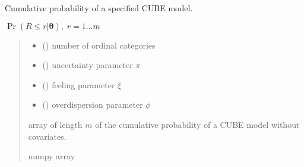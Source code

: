 \documentclass[letterpaper,10pt,english]{sphinxmanual}
\begin{document}
\begin{fulllineitems}
\label{\detokenize{cubmods:cubmods.cube.cmf}}
\pysigstartsignatures
{}
\pysigstopsignatures
\sphinxAtStartPar
Cumulative probability of a specified CUBE model.

\sphinxAtStartPar
\(\Pr(R \leq r | \pmb\theta),\; r=1 \ldots m\)
\begin{quote}\begin{description}
\begin{itemize}
\item {} 
\sphinxAtStartPar
{} () \textendash{} number of ordinal categories

\item {} 
\sphinxAtStartPar
{} () \textendash{} uncertainty parameter \(\pi\)

\item {} 
\sphinxAtStartPar
{} () \textendash{} feeling parameter \(\xi\)

\item {} 
\sphinxAtStartPar
{} () \textendash{} overdispersion parameter \(\phi\)

\end{itemize}

\sphinxAtStartPar
array of length \(m\) of the cumulative probability of a CUBE model without covariates.

\sphinxAtStartPar
numpy array

\end{description}\end{quote}

\end{fulllineitems}

\end{document}
